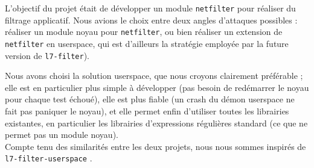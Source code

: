 L'objectif du projet était de développer un module \verb+netfilter+ pour réaliser du filtrage applicatif. Nous avions le choix entre deux angles d'attaques possibles : réaliser un module noyau pour \verb+netfilter+, ou bien réaliser un extension de \verb+netfilter+ en userspace, qui est d'ailleurs la stratégie employée par la future version de \verb+l7-filter+).

Nous avons choisi la solution userspace, que nous croyons clairement préférable ; elle est en particulier plus simple à développer (pas besoin de redémarrer le noyau pour chaque test échoué), elle est plus fiable (un crash du démon userspace ne fait pas paniquer le noyau), et elle permet enfin d'utiliser toutes les librairies existantes, en particulier les librairies d'expressions régulières standard (ce que ne permet pas un module noyau).\\

Compte tenu des similarités entre les deux projets, nous nous sommes inspirés de \verb+l7-filter-userspace+ \cite{RW}.

